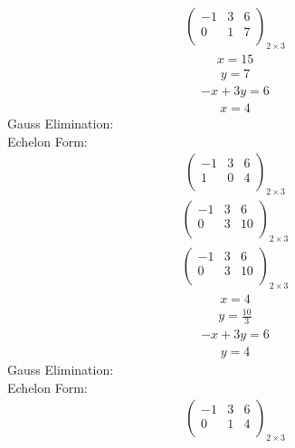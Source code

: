 \documentclass{article}
\begin{document}
\begin{align*}
\left(
\begin{array}{cc|c}
-1 & 3 & 6\\
0 & 1 & 7\\
\end{array}
\right)_{2\times 3}
\end{align*}
\begin{align*}
x=15\end{align*}
\begin{align*}
y=7\end{align*}
\begin{align*}
-x + 3y=6\end{align*}
\begin{align*}
x=4\end{align*}
Gauss Elimination:\\
Echelon Form:\\
\begin{align*}
\left(
\begin{array}{cc|c}
-1 & 3 & 6\\
1 & 0 & 4\\
\end{array}
\right)_{2\times 3}
\end{align*}
\begin{align*}
\left(
\begin{array}{cc|c}
-1 & 3 & 6\\
0 & 3 & 10\\
\end{array}
\right)_{2\times 3}
\end{align*}
\begin{align*}
\left(
\begin{array}{cc|c}
-1 & 3 & 6\\
0 & 3 & 10\\
\end{array}
\right)_{2\times 3}
\end{align*}
\begin{align*}
x=4\end{align*}
\begin{align*}
y=\frac{10}{3}\end{align*}
\begin{align*}
-x + 3y=6\end{align*}
\begin{align*}
y=4\end{align*}
Gauss Elimination:\\
Echelon Form:\\
\begin{align*}
\left(
\begin{array}{cc|c}
-1 & 3 & 6\\
0 & 1 & 4\\
\end{array}
\right)_{2\times 3}
\end{align*}
\end{document}
